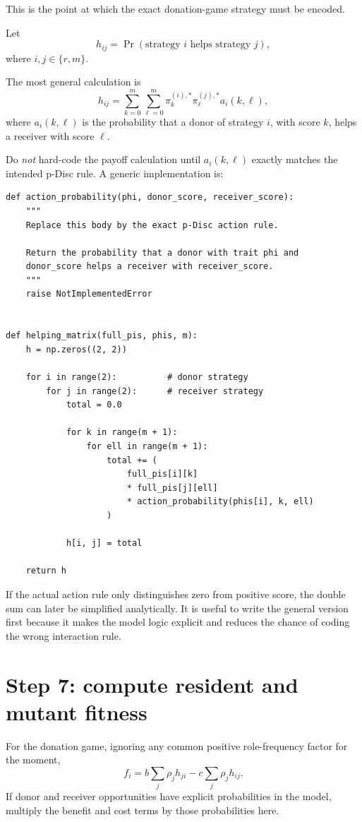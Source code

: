 \documentclass[11pt]{article}
\begin{document}
This is the point at which the exact donation-game strategy must be encoded.

Let
\[
h_{ij}
=
\Pr(\text{strategy }i\text{ helps strategy }j),
\]
where $i,j\in\{r,m\}$.

The most general calculation is
\[
\boxed{
 h_{ij}
 =
 \sum_{k=0}^{m}\sum_{\ell=0}^{m}
 \pi_k^{(i),*}\pi_\ell^{(j),*}
 a_i(k,\ell),
}
\]
where $a_i(k,\ell)$ is the probability that a donor of strategy $i$, with score $k$, helps a receiver with score $\ell$.

Do \emph{not} hard-code the payoff calculation until $a_i(k,\ell)$ exactly matches the intended p-Disc rule. A generic implementation is:

\begin{lstlisting}
def action_probability(phi, donor_score, receiver_score):
    """
    Replace this body by the exact p-Disc action rule.

    Return the probability that a donor with trait phi and
    donor_score helps a receiver with receiver_score.
    """
    raise NotImplementedError


def helping_matrix(full_pis, phis, m):
    h = np.zeros((2, 2))

    for i in range(2):          # donor strategy
        for j in range(2):      # receiver strategy
            total = 0.0

            for k in range(m + 1):
                for ell in range(m + 1):
                    total += (
                        full_pis[i][k]
                        * full_pis[j][ell]
                        * action_probability(phis[i], k, ell)
                    )

            h[i, j] = total

    return h
\end{lstlisting}

If the actual action rule only distinguishes zero from positive score, the double sum can later be simplified analytically. It is useful to write the general version first because it makes the model logic explicit and reduces the chance of coding the wrong interaction rule.

\section{Step 7: compute resident and mutant fitness}

For the donation game, ignoring any common positive role-frequency factor for the moment,
\[
f_i
=
b\sum_j\rho_jh_{ji}
-c\sum_j\rho_jh_{ij}.
\]
If donor and receiver opportunities have explicit probabilities in the model, multiply the benefit and cost terms by those probabilities here.
\end{document}
